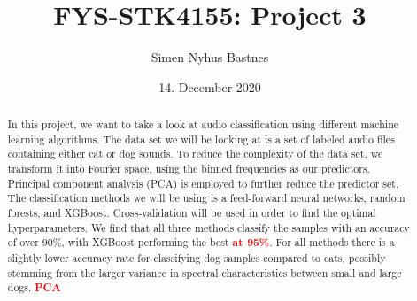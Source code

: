\documentclass[a4paper]{article}
\title{FYS-STK4155: Project 3}
\author{Simen Nyhus Bastnes}
\date{14. December 2020}
\newcommand\red[1]{\textcolor{red}{\textbf{#1}}}
\begin{document}
\maketitle
\begin{abstract}
In this project, we want to take a look at audio classification using different machine learning algorithms. The data set we will be looking at is a set of labeled audio files containing either cat or dog sounds. To reduce the complexity of the data set, we transform it into Fourier space, using the binned frequencies as our predictors. Principal component analysis (PCA) is employed to further reduce the predictor set. The classification methods we will be using is a feed-forward neural networks, random forests, and XGBoost. Cross-validation will be used in order to find the optimal hyperparameters.
We find that all three methods classify the samples with an accuracy of over 90\%, with XGBoost performing the best \red{at 95\%}. For all methods there is a slightly lower accuracy rate for classifying dog samples compared to cats, possibly stemming from the larger variance in spectral characteristics between small and large dogs. \red{PCA}

\end{abstract}
\end{document}

